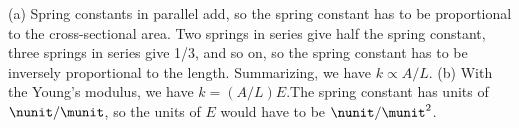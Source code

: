 (a) Spring constants in parallel add, so the spring
constant has to be proportional to the cross-sectional area.
Two springs in series give half the spring constant, three
springs in series give 1/3, and so on, so the spring
constant has to be inversely proportional to the length.
Summarizing, we have $k\propto A/L$. (b) With the Young's modulus,
we have $k=(A/L)E$.The spring constant has units of $\nunit/\munit$, so
the units of $E$ would have to be $\nunit/\munit^2$.




